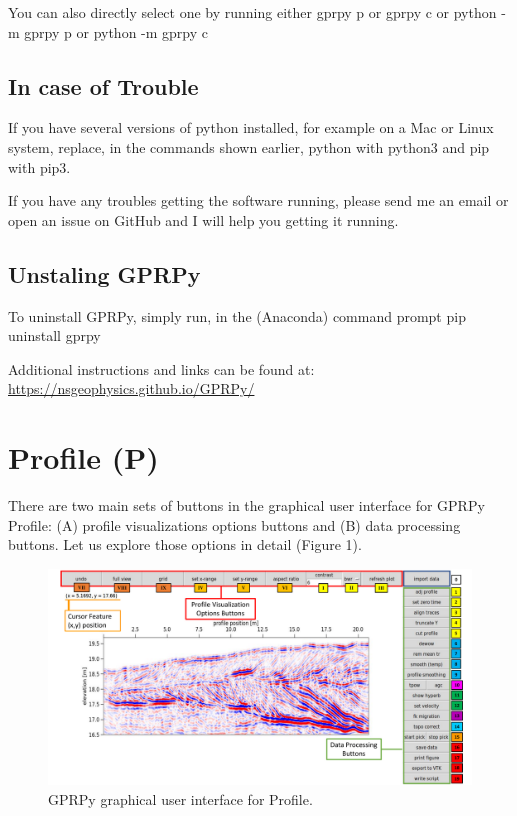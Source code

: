 \documentclass[12pt]{article}
\begin{document}
You can also directly select one by running either
gprpy p
or
gprpy c
or
python -m gprpy p
or
python -m gprpy c


	\subsection{In case of Trouble}
	
If you have several versions of python installed, for example on a Mac or Linux system, replace, in the commands shown earlier, python with python3 and pip with pip3.

If you have any troubles getting the software running, please send me an email or open an issue on GitHub and I will help you getting it running.

	
	
	\subsection{Unstaling GPRPy}

To uninstall GPRPy, simply run, in the (Anaconda) command prompt
pip uninstall gprpy

Additional instructions and links can be found at:
\url{https://nsgeophysics.github.io/GPRPy/}



\section{Profile (P)}\label{Profile (P)}

There are two main sets of buttons in the graphical user interface for GPRPy Profile: (A) profile visualizations options buttons and (B) data processing buttons. Let us explore those options in detail (Figure 1).

											\begin{figure}[h]

	\includegraphics[width=\textwidth]{Figures/Figure1.pdf}
		\caption{GPRPy graphical user interface for Profile.}

											\end{figure}
										
\end{document}
